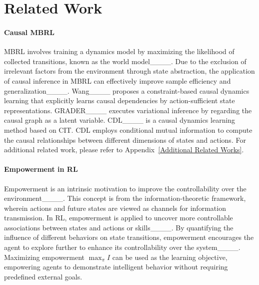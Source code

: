 \section{Related Work}
\paragraph{Causal MBRL}
MBRL involves training a dynamics model by maximizing the likelihood of collected transitions, known as the world model____.
Due to the exclusion of irrelevant factors from the environment through state abstraction, the application of causal inference in MBRL can effectively improve sample efficiency and generalization____. 
Wang____ proposes a constraint-based causal dynamics learning that explicitly learns causal dependencies by action-sufficient state representations. 
GRADER____ executes variational inference by regarding the causal graph as a latent variable. CDL____ is a causal dynamics learning method based on CIT. CDL employs conditional mutual information to compute the causal relationships between different dimensions of states and actions. For additional related work, please refer to Appendix~\ref{Additional Related Works}.
\vspace{-3mm}
\paragraph{Empowerment in RL} 
Empowerment is an intrinsic motivation to improve the controllability over the environment____. This concept is from the information-theoretic framework, wherein actions and future states are viewed as channels for information transmission. In RL, empowerment is applied to uncover more controllable associations between states and actions or skills____. By quantifying the influence of different behaviors on state transitions, empowerment encourages the agent to explore further to enhance its controllability over the system____. Maximizing empowerment $\max_{\pi} I$ can be used as the learning objective, empowering agents to demonstrate intelligent behavior without requiring predefined external goals. 
\vspace{-3mm}
